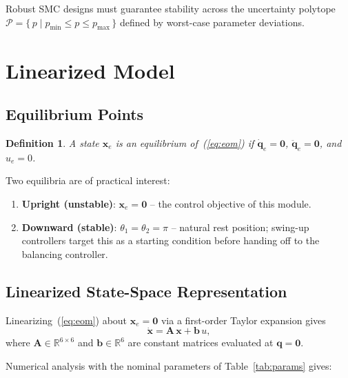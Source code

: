 \documentclass[11pt,a4paper]{article}
\newtheorem{definition}{Definition}[section]
\begin{document}
Robust SMC designs must guarantee stability across the uncertainty polytope
$\mathcal{P} = \{\,p \mid p_{\min} \leq p \leq p_{\max}\,\}$ defined by
worst-case parameter deviations.

\section{Linearized Model}

\subsection{Equilibrium Points}

\begin{definition}
A state $\mathbf{x}_e$ is an \emph{equilibrium} of~(\ref{eq:eom}) if
$\dot{\mathbf{q}}_e = \mathbf{0}$, $\ddot{\mathbf{q}}_e = \mathbf{0}$,
and $u_e = 0$.
\end{definition}

Two equilibria are of practical interest:

\begin{enumerate}
    \item \textbf{Upright (unstable)}: $\mathbf{x}_e = \mathbf{0}$ --
          the control objective of this module.
    \item \textbf{Downward (stable)}: $\theta_1 = \theta_2 = \pi$ --
          natural rest position; swing-up controllers target this as a
          starting condition before handing off to the balancing controller.
\end{enumerate}

\subsection{Linearized State-Space Representation}

Linearizing~(\ref{eq:eom}) about $\mathbf{x}_e = \mathbf{0}$ via a
first-order Taylor expansion gives
\begin{equation}
    \dot{\mathbf{x}} = \mathbf{A}\,\mathbf{x} + \mathbf{b}\,u,
\end{equation}
where $\mathbf{A} \in \mathbb{R}^{6\times6}$ and $\mathbf{b} \in \mathbb{R}^{6}$
are constant matrices evaluated at $\mathbf{q} = \mathbf{0}$.

Numerical analysis with the nominal parameters of Table~\ref{tab:params} gives:
\end{document}
